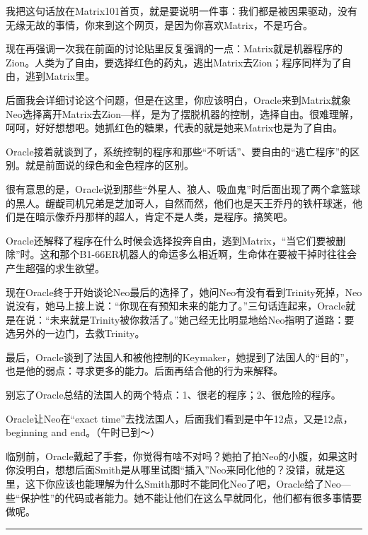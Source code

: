 \documentclass[UTF8]{ctexart}
\newcommand{\myparsep}{\noindent \rule[0.5ex]{\linewidth}{1pt}}
\begin{document}
我把这句话放在Matrix101首页，就是要说明一件事：我们都是被因果驱动，没有无缘无故的事情，你来到这个网页，是因为你喜欢Matrix，不是巧合。

现在再强调一次我在前面的讨论贴里反复强调的一点：Matrix就是机器程序的Zion。人类为了自由，要选择红色的药丸，逃出Matrix去Zion；程序同样为了自由，逃到Matrix里。

后面我会详细讨论这个问题，但是在这里，你应该明白，Oracle来到Matrix就象Neo选择离开Matrix去Zion—样，是为了摆脱机器的控制，选择自由。很难理解，呵呵，好好想想吧。她抓红色的糖果，代表的就是她来Matrix也是为了自由。

Oracle接着就谈到了，系统控制的程序和那些“不听话”、要自由的“逃亡程序”的区别。就是前面说的绿色和金色程序的区别。

很有意思的是，Oracle说到那些“外星人、狼人、吸血鬼”时后面出现了两个拿篮球的黑人。龌龊司机兄弟是芝加哥人，自然而然，他们也是天王乔丹的铁杆球迷，他们是在暗示像乔丹那样的超人，肯定不是人类，是程序。搞笑吧。

Oracle还解释了程序在什么时候会选择投奔自由，逃到Matrix，“当它们要被删除”时。这和那个B1-66ER机器人的命运多么相近啊，生命体在要被干掉时往往会产生超强的求生欲望。

现在Oracle终于开始谈论Neo最后的选择了，她问Neo有没有看到Trinity死掉，Neo说没有，她马上接上说：“你现在有预知未来的能力了。”三句话连起来，Oracle就是在说：“未来就是Trinity被你救活了。”她己经无比明显地给Neo指明了道路：要选另外的一边门，去救Trinity。

最后，Oracle谈到了法国人和被他控制的Keymaker，她提到了法国人的“目的”，也是他的弱点：寻求更多的能力。后面再结合他的行为来解释。

别忘了Oracle总结的法国人的两个特点：1、很老的程序；2、很危险的程序。

Oracle让Neo在“exact time”去找法国人，后面我们看到是中午12点，又是12点，beginning and end。（午时已到～）

临别前，Oracle戴起了手套，你觉得有啥不对吗？她拍了拍Neo的小腹，如果这时你没明白，想想后面Smith是从哪里试图“插入”Neo来同化他的？没错，就是这里，这下你应该也能理解为什么Smith那时不能同化Neo了吧，Oracle给了Neo—些“保护性”的代码或者能力。她不能让他们在这么早就同化，他们都有很多事情要做呢。

\myparsep
\end{document}
